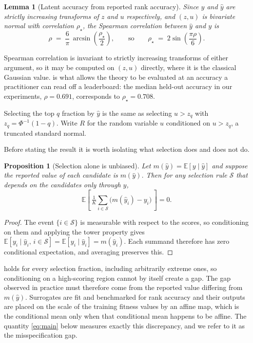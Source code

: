 \documentclass{article}
\theoremstyle{plain}
\newtheorem{proposition}[theorem]{Proposition}
\newtheorem{lemma}[theorem]{Lemma}
\theoremstyle{definition}
\newcommand{\yhat}{\hat{y}}
\newcommand{\Exp}{\mathbb{E}}
\begin{document}
\begin{lemma}[Latent accuracy from reported rank accuracy]
\label{lem:rho}
Since $y$ and $\yhat$ are strictly increasing transforms of $z$ and $u$ respectively,
and $(z,u)$ is bivariate normal with correlation $\rho_\star$, the Spearman correlation
between $\yhat$ and $y$ is
\begin{equation}
\rho \;=\; \frac{6}{\pi}\,\arcsin\!\left(\frac{\rho_\star}{2}\right),
\qquad\text{so}\qquad
\rho_\star \;=\; 2\sin\!\left(\frac{\pi\rho}{6}\right).
\label{eq:rholink}
\end{equation}
\end{lemma}

Spearman correlation is invariant to strictly increasing transforms of either argument,
so it may be computed on $(z,u)$ directly, where it is the classical Gaussian value.
 is what allows the theory to be evaluated at an accuracy a practitioner
can read off a leaderboard: the median held-out accuracy in our experiments,
$\rho = 0.691$, corresponds to $\rho_\star = 0.708$.

Selecting the top $q$ fraction by $\yhat$ is the same as selecting $u > z_q$ with $z_q =
\Phi^{-1}(1-q)$. Write $R$ for the random variable $u$ conditioned on $u > z_q$, a
truncated standard normal.

Before stating the result it is worth isolating what selection does and does not do.

\begin{proposition}[Selection alone is unbiased]
\label{prop:tower}
Let $m(\yhat) = \Exp[y \mid \yhat]$ and suppose the reported value of each candidate is
$m(\yhat)$. Then for any selection rule $\mathcal{S}$ that depends on the candidates
only through $\yhat$,
\begin{equation}
\Exp\!\left[\,\tfrac{1}{K}\textstyle\sum_{i \in \mathcal{S}}\big(m(\yhat_i) - y_i\big)\,\right] = 0 .
\label{eq:tower}
\end{equation}
\end{proposition}

\begin{proof}
The event $\{i \in \mathcal{S}\}$ is measurable with respect to the scores, so
conditioning on them and applying the tower property gives
$\Exp[y_i \mid \yhat_i,\, i \in \mathcal{S}] = \Exp[y_i \mid \yhat_i] = m(\yhat_i)$.
Each summand therefore has zero conditional expectation, and averaging preserves this.
\end{proof}

 holds for every selection fraction, including arbitrarily extreme
ones, so conditioning on a high-scoring region cannot by itself create a gap. The gap
observed in practice must therefore come from the reported value differing from
$m(\yhat)$. Surrogates are fit and benchmarked for rank accuracy and their outputs are
placed on the scale of the training fitness values by an affine map, which is the
conditional mean only when that conditional mean happens to be affine. The quantity
\cref{eq:main} below measures exactly this discrepancy, and we refer to it as the
misspecification gap.
\end{document}
